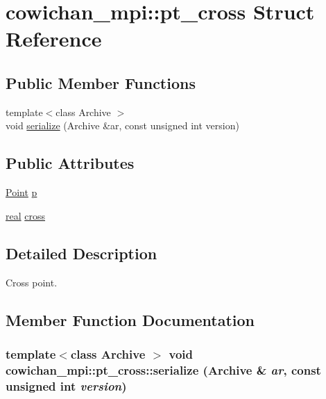 \hypertarget{structcowichan__mpi_1_1pt__cross}{
\section{cowichan\_\-mpi::pt\_\-cross Struct Reference}
\label{structcowichan__mpi_1_1pt__cross}
}
\subsection*{Public Member Functions}
\begin{CompactItemize}
\item 
{\footnotesize template$<$class Archive $>$ }\\void \hyperlink{structcowichan__mpi_1_1pt__cross_03901561c311eec5612eb0b0cd6fa336}{serialize} (Archive \&ar, const unsigned int version)
\end{CompactItemize}
\subsection*{Public Attributes}
\begin{CompactItemize}
\item 
\hyperlink{class_point}{Point} \hyperlink{structcowichan__mpi_1_1pt__cross_b829b3769c8e6c61221d1f9a41e18a83}{p}
\item 
\hyperlink{cowichan_8hpp_4d521b2c54a1f6312cc8fa04827eaf98}{real} \hyperlink{structcowichan__mpi_1_1pt__cross_33466b2228b7e4bb94efb8d04ca19f81}{cross}
\end{CompactItemize}


\subsection{Detailed Description}
Cross point. 

\subsection{Member Function Documentation}
\hypertarget{structcowichan__mpi_1_1pt__cross_03901561c311eec5612eb0b0cd6fa336}{
\subsubsection[{serialize}]{\setlength{\rightskip}{0pt plus 5cm}template$<$class Archive $>$ void cowichan\_\-mpi::pt\_\-cross::serialize (Archive \& {\em ar}, \/  const unsigned int {\em version})}}
\label{structcowichan__mpi_1_1pt__cross_03901561c311eec5612eb0b0cd6fa336}


